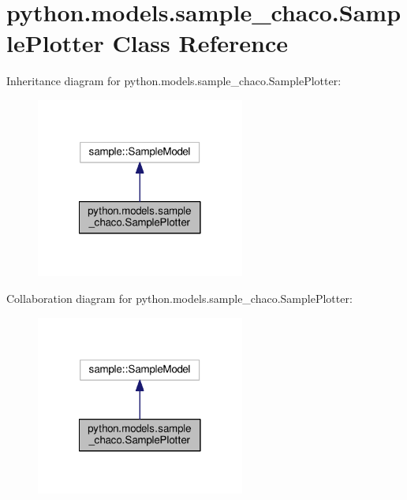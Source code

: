\hypertarget{classpython_1_1models_1_1sample__chaco_1_1_sample_plotter}{\section{python.\-models.\-sample\-\_\-chaco.\-Sample\-Plotter Class Reference}
\label{classpython_1_1models_1_1sample__chaco_1_1_sample_plotter}
}


Inheritance diagram for python.\-models.\-sample\-\_\-chaco.\-Sample\-Plotter\-:
\nopagebreak
\begin{figure}[H]
\begin{center}
\leavevmode
\includegraphics[width=194pt]{classpython_1_1models_1_1sample__chaco_1_1_sample_plotter__inherit__graph}
\end{center}
\end{figure}


Collaboration diagram for python.\-models.\-sample\-\_\-chaco.\-Sample\-Plotter\-:
\nopagebreak
\begin{figure}[H]
\begin{center}
\leavevmode
\includegraphics[width=194pt]{classpython_1_1models_1_1sample__chaco_1_1_sample_plotter__coll__graph}
\end{center}
\end{figure}

